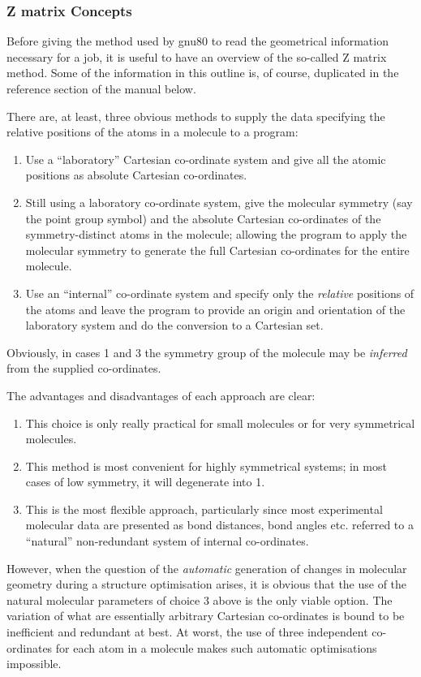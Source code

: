
\subsubsection{Z matrix Concepts}
Before giving the method used by gnu80 to read the geometrical
information necessary for a job, it is useful to have an
overview of the so-called Z matrix method. Some of the
information in this outline is, of course, duplicated in the
reference section of the manual below.

There are, at least, three obvious methods to supply the
data specifying the relative positions of the atoms in a
molecule to a program:
\begin{enumerate}
\item Use a ``laboratory'' Cartesian co-ordinate
system and give all the atomic positions as absolute
Cartesian co-ordinates.
\item Still using a laboratory co-ordinate system, give the
molecular symmetry (say the point group symbol) and the absolute
Cartesian co-ordinates of the symmetry-distinct atoms in the molecule;
allowing the program to apply the molecular symmetry to generate the
full Cartesian co-ordinates for the entire molecule.
\item Use an ``internal'' co-ordinate system and specify
only the {\em relative} positions of the atoms and leave the program
to provide an origin and orientation of the laboratory system and do the
conversion to a Cartesian set.
\end{enumerate}
Obviously, in cases 1 and 3 the symmetry group of the molecule
may be {\em inferred} from the supplied co-ordinates.

The advantages and disadvantages of each approach are clear:
\begin{enumerate}
\item This choice is only really practical for small molecules or
for very symmetrical molecules.
\item This method is most convenient for highly symmetrical systems;
in most cases of low symmetry, it will degenerate into 1.
\item This is the most flexible approach, particularly since most
experimental molecular data are presented as bond distances, bond
angles etc. referred to a ``natural'' non-redundant
system of internal co-ordinates.
\end{enumerate}
However, when the question of the {\em automatic} generation
of changes in molecular geometry during a structure optimisation arises,
it is obvious that the use of the natural molecular parameters
of choice 3 above is the only viable option. The variation of
what are essentially arbitrary Cartesian co-ordinates is bound to be
inefficient and redundant at best. At worst, the use of three independent
co-ordinates for each atom in a molecule makes such automatic 
optimisations impossible.

